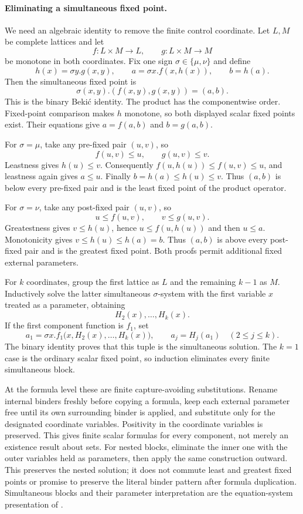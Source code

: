 \paragraph{Eliminating a simultaneous fixed point.}
\label{sec:p09-mu-bekic}
We need an algebraic identity to
remove the finite control coordinate.
Let \(L,M\) be complete lattices
and let
\[
 f:L\times M\to L,\qquad
 g:L\times M\to M
\]
be monotone in both coordinates.
Fix one sign \(\sigma\in\{\mu,\nu\}\)
and define
\[
 h(x)=\sigma y.g(x,y),\qquad
 a=\sigma x.f(x,h(x)),\qquad b=h(a).
\]
Then the simultaneous fixed point is
\[
 \sigma(x,y).(f(x,y),g(x,y))=(a,b).
\]
This is the binary Beki\'c identity.
The product has the componentwise order.
Fixed-point comparison makes \(h\)
monotone, so both displayed scalar
fixed points exist.
Their equations give
\(a=f(a,b)\) and \(b=g(a,b)\).

For \(\sigma=\mu\), take any
pre-fixed pair \((u,v)\), so
\[
 f(u,v)\leq u,\qquad g(u,v)\leq v.
\]
Leastness gives \(h(u)\leq v\).
Consequently
\(f(u,h(u))\leq f(u,v)\leq u\),
and leastness again gives \(a\leq u\).
Finally \(b=h(a)\leq h(u)\leq v\).
Thus \((a,b)\) is below every
pre-fixed pair and is the least
fixed point of the product operator.

For \(\sigma=\nu\), take any
post-fixed pair \((u,v)\), so
\[
 u\leq f(u,v),\qquad v\leq g(u,v).
\]
Greatestness gives \(v\leq h(u)\),
hence \(u\leq f(u,h(u))\) and
then \(u\leq a\).
Monotonicity gives
\(v\leq h(u)\leq h(a)=b\).
Thus \((a,b)\) is above every
post-fixed pair and is the greatest
fixed point. Both proofs permit
additional fixed external parameters.

For \(k\) coordinates, group the
first lattice as \(L\) and the
remaining \(k-1\) as \(M\).
Inductively solve the latter
simultaneous \(\sigma\)-system
with the first variable \(x\)
treated as a parameter, obtaining
\[
 H_2(x),\ldots,H_k(x).
\]
If the first component function
is \(f_1\), set
\[
 a_1=\sigma x.
       f_1\bigl(x,H_2(x),\ldots,H_k(x)\bigr),
 \qquad
 a_j=H_j(a_1)\quad(2\leq j\leq k).
\]
The binary identity proves that
this tuple is the simultaneous
solution. The \(k=1\) case is
the ordinary scalar fixed point,
so induction eliminates every
finite simultaneous block.

At the formula level these are
finite capture-avoiding substitutions.
Rename internal binders freshly
before copying a formula, keep
each external parameter free
until its own surrounding binder
is applied, and substitute only
for the designated coordinate
variables. Positivity in the
coordinate variables is preserved.
This gives finite scalar formulas
for every component, not merely
an existence result about sets.
For nested blocks, eliminate the
inner one with the outer variables
held as parameters, then apply
the same construction outward.
This preserves the nested solution;
it does not commute least and
greatest fixed points or promise
to preserve the literal binder
pattern after formula duplication.
Simultaneous blocks and their
parameter interpretation are the
equation-system presentation of
\cite[\S3.7]{BradfieldStirling2007}.

